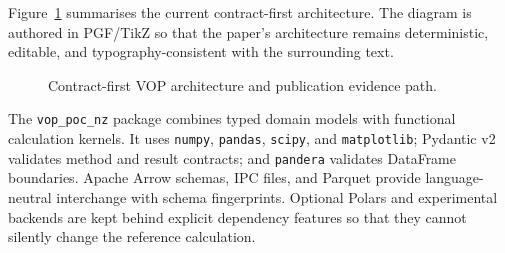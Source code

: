 \documentclass[article]{jss}
\newcommand{\pkg}[1]{\texttt{#1}}
\begin{document}
Figure~\ref{fig:contract-architecture} summarises the current contract-first
architecture. The diagram is authored in PGF/TikZ so that the paper's
architecture remains deterministic, editable, and typography-consistent with
the surrounding text.
\begin{figure}[htbp]
\centering
{}
\caption{Contract-first VOP architecture and publication evidence path.}
\label{fig:contract-architecture}
\end{figure}

The \pkg{vop\_poc\_nz} package combines typed domain models with functional
calculation kernels. It uses \pkg{numpy}, \pkg{pandas}, \pkg{scipy}, and
\pkg{matplotlib}; Pydantic v2 validates method and result contracts; and
\pkg{pandera} validates DataFrame boundaries. Apache Arrow schemas, IPC files,
and Parquet provide language-neutral interchange with schema fingerprints.
Optional Polars and experimental backends are kept behind explicit dependency
features so that they cannot silently change the reference calculation.
\end{document}
